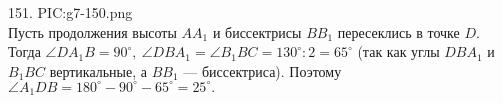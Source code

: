 151.  {{PIC:g7-150.png}}\\
Пусть продолжения высоты $AA_1$ и биссектрисы $BB_1$ пересеклись в точке $D.$ Тогда $\angle DA_1B=90^\circ,\ \angle DBA_1=\angle B_1BC=130^\circ:2=65^\circ$ (так как углы $DBA_1$ и $B_1BC$ вертикальные, а $BB_1$ --- биссектриса). Поэтому $\angle A_1DB=180^\circ-90^\circ-65^\circ=25^\circ.$\\
